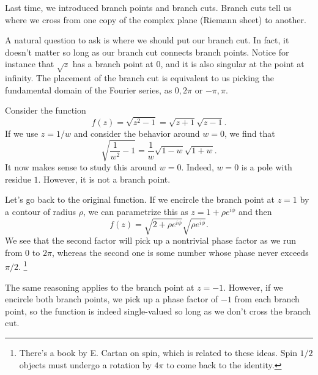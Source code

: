 Last time, we introduced branch points and branch cuts. Branch cuts tell us where we cross from one copy of the complex plane (Riemann sheet) to another.

A natural question to ask is where we should put our branch cut. In fact, it doesn't matter so long as our branch cut connects branch points. Notice for instance that $\sqrt{z}$ has a branch point at $0$, and it is also singular at the point at infinity. The placement of the branch cut is equivalent to us picking the fundamental domain of the Fourier series, as $0,2\pi$ or $-\pi,\pi$.

\begin{exm}
    Consider the function
    \begin{equation}
        f(z) = \sqrt{z^2-1} = \sqrt{z+1}\sqrt{z-1}.
    \end{equation}
    If we use $z=1/w$ and consider the behavior around $w=0$, we find that
    \begin{equation}
        \sqrt{\frac{1}{w^2}-1} = \frac{1}{w} \sqrt{1-w}\sqrt{1+w}.
    \end{equation}
    It now makes sense to study this around $w=0$. Indeed, $w=0$ is a pole with residue $1$. However, it is not a branch point.
    
    Let's go back to the original function. If we encircle the branch point at $z=1$ by a contour of radius $\rho$, we can parametrize this as $z=1+\rho e^{i\phi}$ and then
    \begin{equation}
        f(z) = \sqrt{2+\rho e^{i\phi}}\sqrt{\rho e^{i\phi}}.
    \end{equation}
    We see that the second factor will pick up a nontrivial phase factor as we run from $0$ to $2\pi$, whereas the second one is some number whose phase never exceeds $\pi/2$.%
        \footnote{There's a book by E. Cartan on spin, which is related to these ideas. Spin $1/2$ objects must undergo a rotation by $4\pi$ to come back to the identity.}
    
    The same reasoning applies to the branch point at $z=-1$. However, if we encircle both branch points, we pick up a phase factor of $-1$ from each branch point, so the function is indeed single-valued so long as we don't cross the branch cut.
\end{exm}

